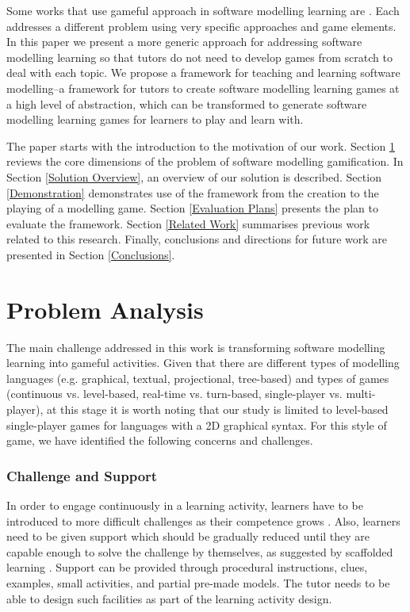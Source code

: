 \documentclass[conference]{IEEEtran}
\begin{document}
Some works that use gameful approach in software modelling learning are 
\cite{Groenewegen2010, Stikkolorum2014, Richardsen2014, Ionita2015,  de2015gamification}. Each addresses a different problem using very specific approaches and game elements. In this paper we present a more generic approach for addressing software modelling learning so that tutors do not need to develop games from scratch to deal with each topic. We propose a framework for teaching and learning software modelling--a framework for tutors to create software modelling learning games at a high level of abstraction, which can be transformed to generate software modelling learning games for learners to play and learn with.

The paper starts with the introduction to the motivation of our work. Section \ref{Problem Analysis} reviews the core dimensions of the problem of software modelling gamification. In Section \ref{Solution Overview}, an overview of our solution is described. Section \ref{Demonstration} demonstrates use of the framework from the creation to the playing of a modelling game. Section \ref{Evaluation Plans} presents the plan to evaluate the framework. Section \ref{Related Work} summarises previous work related to this research. Finally, conclusions and directions for future work are presented in Section \ref{Conclusions}.

\section{Problem Analysis}
\label{Problem Analysis}
The main challenge addressed in this work is transforming software modelling learning into gameful activities. Given that there are different types of modelling languages (e.g. graphical, textual, projectional, tree-based) and types of games (continuous vs. level-based, real-time vs. turn-based, single-player vs. multi-player), at this stage it is worth noting that our study is limited to level-based single-player games for languages with a 2D graphical syntax. For this style of game, we have identified the following concerns and challenges.

\subsubsection{Challenge and Support}
\label{Challenge and Support}
In order to engage continuously in a learning activity, learners have to be introduced to more difficult challenges as their competence grows \cite{csikszentmihalyi2014toward}. Also, learners need to be given support which should be gradually reduced until they are capable enough to solve the challenge by themselves, as suggested by scaffolded learning \cite{wood1976role, vygotsky1978mind}. Support can be provided through procedural instructions, clues, examples, small activities, and partial pre-made models. The tutor needs to be able to design such facilities as part of the learning activity design. 
\end{document}
